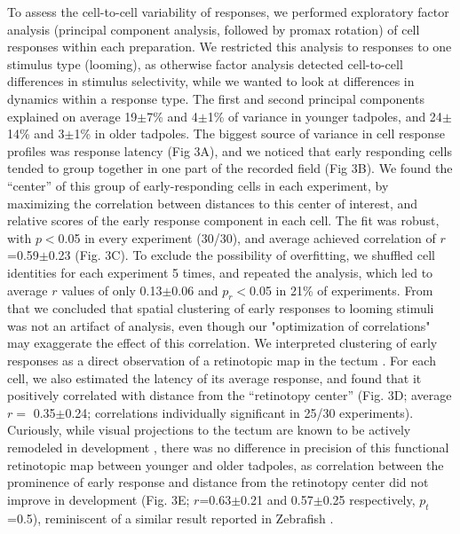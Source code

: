 \documentclass{article}
\begin{document}
To assess the cell-to-cell variability of responses, we performed exploratory factor analysis (principal component analysis, followed by promax rotation) of cell responses within each preparation. We restricted this analysis to responses to one stimulus type (looming), as otherwise factor analysis detected cell-to-cell differences in stimulus selectivity, while we wanted to look at differences in dynamics within a response type. The first and second principal components explained on average 19$\pm$7\% and 4$\pm$1\% of variance in younger tadpoles, and 24$\pm$14\% and 3$\pm$1\% in older tadpoles. The biggest source of variance in cell response profiles was response latency (Fig 3A), and we noticed that early responding cells tended to group together in one part of the recorded field (Fig 3B). We found the “center” of this group of early-responding cells in each experiment, by maximizing the correlation between distances to this center of interest, and relative scores of the early response component in each cell. The fit was robust, with $p<$0.05 in every experiment (30/30), and average achieved correlation of $r$=0.59$\pm$0.23 (Fig. 3C). To exclude the possibility of overfitting, we shuffled cell identities for each experiment 5 times, and repeated the analysis, which led to average $r$ values of only 0.13$\pm$0.06 and $p_r<$0.05 in 21\% of experiments. From that we concluded that spatial clustering of early responses to looming stimuli was not an artifact of analysis, even though our "optimization of correlations" may exaggerate the effect of this correlation. We interpreted clustering of early responses as a direct observation of a retinotopic map in the tectum \citep{ruthazer2004map}. For each cell, we also estimated the latency of its average response, and found that it positively correlated with distance from the “retinotopy center” (Fig. 3D; average $r=$ 0.35$\pm$0.24; correlations individually significant in 25/30 experiments). Curiously, while visual projections to the tectum are known to be actively remodeled in development \citep{sakaguchi1985refinement,ruthazer2004map,munz2014hebbian}, there was no difference in precision of this functional retinotopic map between younger and older tadpoles, as correlation between the prominence of early response and distance from the retinotopy center did not improve in development (Fig. 3E; $r$=0.63$\pm$0.21 and 0.57$\pm$0.25 respectively, $p_t$=0.5), reminiscent of a similar result reported in Zebrafish \citep{avitan2016limitations}.
\end{document}
